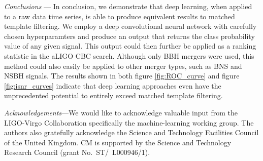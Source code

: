 \documentclass[%
 amsmath,amssymb,
 aps,
 twocolumn,
 prl,
 reprint,
floatfix,
]{revtex4-1}
\begin{document}
%
%
\textit{Conclusions} --- In conclusion, we demonstrate that deep learning, when
applied to a raw data time series, is able to produce equivalent results to
matched template filtering. We employ a deep convolutional neural network with
carefully chosen hyperparamters and produce an output that returns the class
probability value of any given signal. This output could then further be
applied as a ranking statistic in the aLIGO CBC search. Although only BBH
mergers were used, this method could also easily be applied to other merger
types, such as BNS and NSBH signals. The results shown in both figure
\ref{fig:ROC_curve} and figure \ref{fig:isnr_curves} indicate that deep
learning approaches even have the unprecedented potential to entirely exceed
matched template filtering. 

\emph{Acknowledgements}---We would like to acknowledge valuable input from the
LIGO-Virgo Collaboration specifically the machine-learning working group. The
authors also gratefully acknowledge the Science and Technology Facilities
Council of the United Kingdom.  CM is supported by the Science and Technology
Research Council (grant No.~ST/~L000946/1).
%




\end{document}
